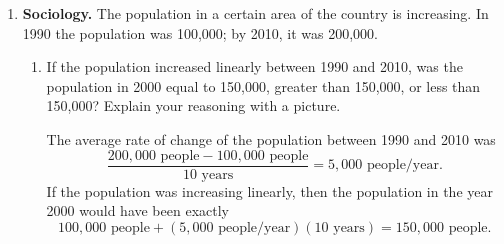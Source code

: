 \documentclass{article}
\begin{document}
\begin{enumerate}
\begin{enumerate}
  \item
    \begin{problem}[\stretch{0.75}]
      How many years would it take a 100 mg sample of radium-226 to decay
      to 25 mg? 
    \end{problem}

    \begin{solution}
      This would take two half-lives, or 3200 years.
    \end{solution}

  \item \label{exp-radium-226-estimate}


    \begin{problem}[\stretch{0.75}]
      How many years would it take a 100 mg sample of radium-226 to decay to 10 mg? 
    \end{problem}

    \begin{solution}
      This would take between 3 and 4 half-lives, so between 4800 and 6400 years, but we
      haven't yet learned how to find the exact number of years. We would need to
      solve the equation $100\left(\frac{1}{2}\right)^{t/16} = 10$.
    \end{solution}

  \end{enumerate}

\item  \textbf{Sociology.} The population in a certain area of the country is increasing. In 1990 the population was 100,000; by 2010, it was 200,000.

  \begin{enumerate}

  \item
    \begin{problem}[\vfill]
      If the population increased linearly between 1990 and 2010, was the population in 2000 equal to 150,000, greater than 150,000, or less than 150,000? Explain your reasoning with a picture.
    \end{problem}

    \begin{solution}
      The average rate of change of the population between 1990 and 2010 was 
      \[\frac{200,000\text{ people} - 100,000\text{ people}}{10 \text{ years}} = 5,000 
      \text{ people/year}.\]
      If the population was increasing linearly, then the population in the year 2000
      would have been exactly
      \[100,000\text{ people} + (5,000\text{ people/year})(10\text{ years}) = 
      150,000\text{ people}.\]
    \end{solution}


\end{enumerate}
\end{enumerate}
\end{document}
